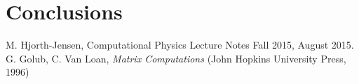 \documentclass[10pt,showpacs,preprintnumbers,footinbib,amsmath,amssymb,aps,prl,twocolumn,groupedaddress,superscriptaddress,showkeys]{revtex4-1}
\begin{document}
\section{Conclusions}

\begin{thebibliography}{99}
 M. Hjorth-Jensen, Computational Physics Lecture Notes Fall 2015, August 2015.
 G. Golub, C. Van Loan, \textit{Matrix Computations} (John Hopkins University Press, 1996)
\end{thebibliography}
\end{document}
